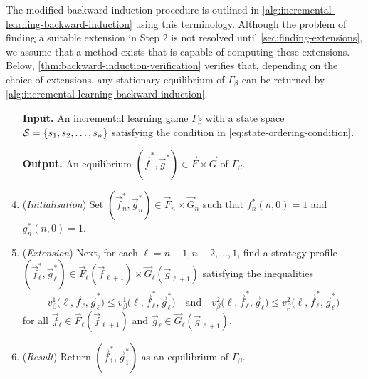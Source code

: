     The modified backward induction procedure is outlined in \autoref{alg:incremental-learning-backward-induction} using this terminology.
    Although the problem of finding a suitable extension in Step 2 is not resolved until \autoref{sec:finding-extensions}, we assume that a method exists that is capable of computing these extensions.
    Below, \autoref{thm:backward-induction-verification} verifies that, depending on the choice of extensions, any stationary equilibrium of $\Gamma_\beta$ can be returned by \autoref{alg:incremental-learning-backward-induction}.

    \begin{algorithm} \label{alg:incremental-learning-backward-induction}
    \begin{enumerate}[
        leftmargin=*,
        align=left,
        label=\textbf{Step \arabic*.}
    ]
        \item[]
    
        \item[\textbf{Input.}] An incremental learning game $\Gamma_\beta$ with a state space $\mathcal{S} = \{s_1, s_2, \ldots, s_n\}$ satisfying the condition in \eqref{eq:state-ordering-condition}.
        
        \item[\textbf{Output.}] An equilibrium $(\vec{f}^*, \vec{g}^*) \in \vec{F} \times \vec{G}$ of $\Gamma_\beta$.
        
        \item (\textit{Initialisation}) Set $(\vec{f}^*_n, \vec{g}^*_n) \in \vec{F}_n \times \vec{G}_n$ such that $f^*_n(n, 0) = 1$ and $g^*_n(n, 0) = 1$.

        \item (\textit{Extension}) Next, for each $\ell = n - 1, n - 2, \ldots, 1$, find a strategy profile $(\vec{f}^*_\ell, \vec{g}^*_\ell) \in \vec{F}_\ell(\vec{f}_{\ell + 1}) \times \vec{G}_\ell(\vec{g}_{\ell + 1})$ satisfying the inequalities
        \begin{equation}  \label{eq:extension-nash-equilibrium}
            v_\beta^1\big(\ell, \vec{f}_\ell, \vec{g}^*_\ell\big)
                \le v_\beta^1\big(\ell, \vec{f}^*_\ell, \vec{g}^*_\ell\big)
            \quad\text{and}\quad
            v_\beta^2\big(\ell, \vec{f}^*_\ell, \vec{g}_\ell\big)
                \le v_\beta^2\big(\ell, \vec{f}^*_\ell, \vec{g}^*_\ell\big)
        \end{equation}
        for all $\vec{f}_\ell \in \vec{F}_\ell(\vec{f}_{\ell + 1})$ and $\vec{g}_\ell \in \vec{G}_\ell(\vec{g}_{\ell + 1})$.

        \item (\textit{Result}) Return  $(\vec{f}^*_1, \vec{g}^*_1)$ as an equilibrium of $\Gamma_\beta$.
    \end{enumerate}
    \end{algorithm}

